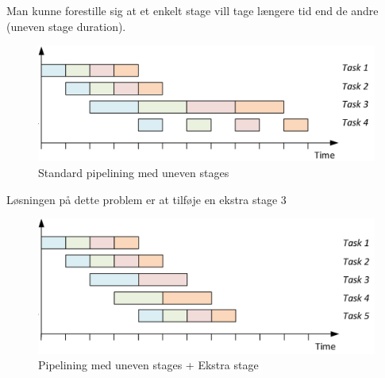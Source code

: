 Man kunne forestille sig at et enkelt stage vill tage længere tid end de andre (uneven stage duration).

\begin{figure}[H]
	\centering
	\includegraphics[width=0.7\linewidth]{figs/pipeFut/unevenStage}
	\caption{Standard pipelining med uneven stages}
	\label{fig:Unevenpipelining}
\end{figure}

Løsningen på dette problem er at tilføje en ekstra stage 3

\begin{figure}[H]
	\centering
	\includegraphics[width=0.7\linewidth]{figs/pipeFut/ekstraFilter}
	\caption{Pipelining med uneven stages + Ekstra stage}
	\label{fig:UnevenpipeliningWStage}
\end{figure}
